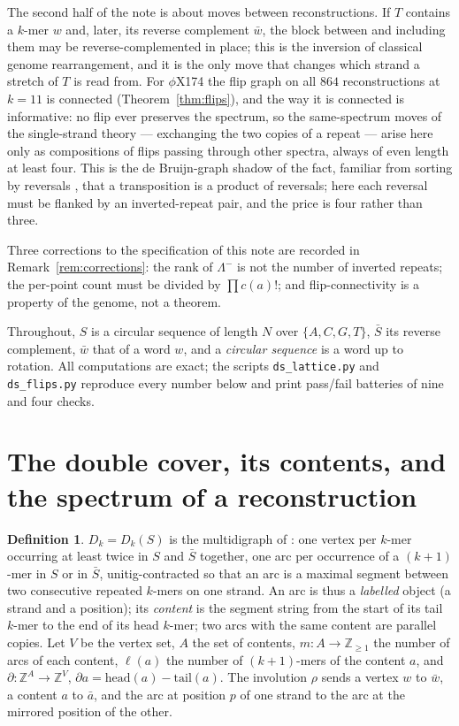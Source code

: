 \documentclass[11pt]{article}
\theoremstyle{plain}
\theoremstyle{definition}
\newtheorem{definition}[theorem]{Definition}
\theoremstyle{remark}
\newcommand{\Z}{\mathbb{Z}}
\newcommand{\Lm}{\Lambda^{-}}
\begin{document}
The second half of the note is about moves between reconstructions. If $T$ contains a $k$-mer
$w$ and, later, its reverse complement $\bar w$, the block between and including them may be
reverse-complemented in place; this is the inversion of classical genome rearrangement, and it
is the only move that changes which strand a stretch of $T$ is read from. For $\phi$X174 the
flip graph on all $864$ reconstructions at $k=11$ is connected (Theorem~\ref{thm:flips}),
and the way it is connected is informative: no flip ever preserves the spectrum, so the
same-spectrum moves of the single-strand theory --- exchanging the two copies of a repeat ---
arise here only as compositions of flips passing through other spectra, always of even length
at least four. This is the de Bruijn-graph shadow of the fact, familiar from sorting by
reversals \cite{HP99,BP96}, that a transposition is a product of reversals; here each reversal
must be flanked by an inverted-repeat pair, and the price is four rather than three.

Three corrections to the specification of this note are recorded in
Remark~\ref{rem:corrections}: the rank of $\Lm$ is not the number of inverted repeats; the
per-point count must be divided by $\prod c(a)!$; and flip-connectivity is a property of the
genome, not a theorem.

Throughout, $S$ is a circular sequence of length $N$ over $\{A,C,G,T\}$, $\bar S$ its reverse
complement, $\bar w$ that of a word $w$, and a \emph{circular sequence} is a word up to
rotation. All computations are exact; the scripts \texttt{ds\_lattice.py} and
\texttt{ds\_flips.py} reproduce every number below and print pass/fail batteries of nine and
four checks.

\section{The double cover, its contents, and the spectrum of a reconstruction}

\begin{definition}\label{def:cover}
$D_k=D_k(S)$ is the multidigraph of \cite{Bio6}: one vertex per $k$-mer occurring at least
twice in $S$ and $\bar S$ together, one arc per occurrence of a $(k{+}1)$-mer in $S$ or in
$\bar S$, unitig-contracted so that an arc is a maximal segment between two consecutive
repeated $k$-mers on one strand. An arc is thus a \emph{labelled} object (a strand and a
position); its \emph{content} is the segment string from the start of its tail $k$-mer to the
end of its head $k$-mer; two arcs with the same content are parallel copies. Let $V$ be the
vertex set, $A$ the set of contents, $m\colon A\to\Z_{\ge1}$ the number of arcs of each
content, $\ell(a)$ the number of $(k{+}1)$-mers of the content $a$, and $\partial\colon
\Z^A\to\Z^V$, $\partial a=\mathrm{head}(a)-\mathrm{tail}(a)$. The involution $\rho$ sends a
vertex $w$ to $\bar w$, a content $a$ to $\bar a$, and the arc at position $p$ of one strand to
the arc at the mirrored position of the other.
\end{definition}
\end{document}
